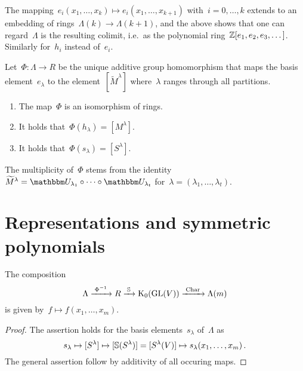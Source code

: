 \documentclass[a4paper,10pt]{scrartcl}
\begin{document}
The mapping~$e_i(x_1, \dotsc, x_k) \mapsto e_i(x_1, \dotsc, x_{k+1})$ with~$i = 0, \dotsc, k$ extends to an embedding of rings~$\Lambda(k) \to \Lambda(k+1)$, and the above shows that one can regard~$\Lambda$ is the resulting colimit, i.e.\ as the polynomial ring~$\mathbb{Z}[e_1, e_2, e_3, \dotsc]$.
Similarly for~$h_i$ instead of~$e_i$.

\begin{theorem}
  Let~$\Phi \colon \Lambda \to R$ be the unique additive group homomorphism that maps the basis element~$e_\lambda$ to the element~$[\widetilde{M}^\lambda]$ where~$\lambda$ ranges through all partitions.
  \begin{enumerate}
    \item
      The map~$\Phi$ is an isomorphism of rings.
    \item
      It holds that~$\Phi(h_\lambda) = [M^\lambda]$.
    \item
      It holds that~$\Phi(s_\lambda) = [S^\lambda]$.
  \end{enumerate}
\end{theorem}

The multiplicity of~$\Phi$ stems from the identity~$\widetilde{M}^\lambda = \signrep_{\lambda_1} \circ \dotsb \circ \signrep_{\lambda_t}$ for~$\lambda = (\lambda_1, \dotsc, \lambda_t)$.





\section{Representations and symmetric polynomials}

\begin{corollary}
  The composition
  \[
    \Lambda
    \xrightarrow{\;\Phi^{-1}\;}
    R
    \xrightarrow{\;\mathbb{S}\;}
    \operatorname{K}_0(\operatorname{GL}(V))
    \xrightarrow{\;\operatorname{Char}\;}
    \Lambda(m)
  \]
  is given by~$f \mapsto f(x_1, \dotsc, x_m)$.
\end{corollary}

\begin{proof}
  The assertion holds for the basis elements~$s_\lambda$ of~$\Lambda$ as
  \[
    s_\lambda
    \mapsto
    [S^\lambda]
    \mapsto
    [\mathbb{S}(S^\lambda)]
    =
    [S^\lambda(V)]
    \mapsto
    s_\lambda(x_1, \dotsc, x_m) \,.
  \]
  The general assertion follow by additivity of all occuring maps.
\end{proof}
\end{document}
